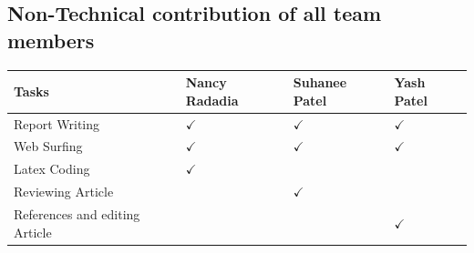 \documentclass{article}
\begin{document}
\subsection{Non-Technical contribution of all team members }
\begin{table}[h]
\centering
\begin{tabular}{|l|l|l|l|}
\hline
Tasks  & Nancy Radadia & Suhanee Patel & Yash Patel      \\ \hline
Report Writing & \hspace{1cm}$ \checkmark $&       \hspace{1cm}$ \checkmark $        &     \hspace{0.7cm}$ \checkmark $            \\ \hline
Web Surfing &    \hspace{1cm}$ \checkmark $           &     \hspace{1cm}$ \checkmark $          &      \hspace{0.7cm}$ \checkmark $         \\ \hline
Latex Coding &   \hspace{1cm}$ \checkmark $            &               &               \\ \hline
Reviewing Article &               &        \hspace{1cm}$ \checkmark $       &               \\ \hline
References and editing Article &               &               &    \hspace{0.7cm}$ \checkmark $           \\ \hline
\end{tabular}
\end{table}




\end{document}
